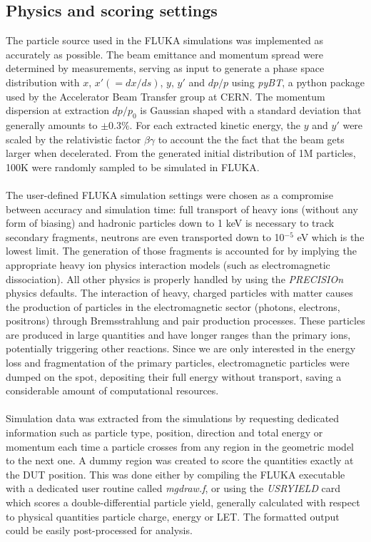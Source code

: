 \subsection{Physics and scoring settings}\label{sec:physics}
The particle source used in the FLUKA simulations was implemented as accurately as possible. The beam emittance and momentum spread were determined by measurements, serving as input to generate a phase space distribution with $x$, $x' (=dx/ds)$, $y$, $y'$ and $dp/p$ using \emph{pyBT}, a python package used by the Accelerator Beam Transfer group at CERN. The momentum dispersion  at extraction $dp/p_0$ is Gaussian shaped with a standard deviation that generally amounts to $\pm 0.3\%$. For each extracted kinetic energy, the $y$ and $y'$ were scaled by the relativistic factor $\beta \gamma$ to account the the fact that the beam gets larger when decelerated. From the generated initial distribution of 1M particles, 100K were randomly sampled to be simulated in FLUKA.\\
\\
The user-defined FLUKA simulation settings were chosen as a compromise between accuracy and simulation time: 
full transport of heavy ions (without any form of biasing) and hadronic particles down to 1 keV is necessary to track secondary fragments, neutrons are even transported down to 10$^{-5}$ eV which is the lowest limit. The generation of those fragments is accounted for by implying the appropriate heavy ion physics interaction models (such as electromagnetic dissociation). All other physics is properly handled by using the \emph{PRECISIOn} physics defaults. The interaction of heavy, charged particles with matter causes the production of particles in the electromagnetic sector (photons, electrons, positrons) through Bremsstrahlung and pair production processes. These particles are produced in large quantities and have longer ranges than the primary ions, potentially triggering other reactions. Since we are only interested in the energy loss and fragmentation of the primary particles, electromagnetic particles were dumped on the spot, depositing their full energy without transport, saving a considerable amount of computational resources.\\
 \\
Simulation data was extracted from the simulations by requesting dedicated information such as particle type, position, direction and total energy or momentum each time a particle crosses from any region in the geometric model to the next one. A dummy region was created to score the quantities exactly at the DUT position. This was done either by compiling the FLUKA executable with a dedicated user routine called \emph{mgdraw.f}, or using the \emph{USRYIELD} card which scores a double-differential particle yield, generally calculated with respect to physical quantities particle charge, energy or LET. The formatted output could be easily post-processed for analysis.

